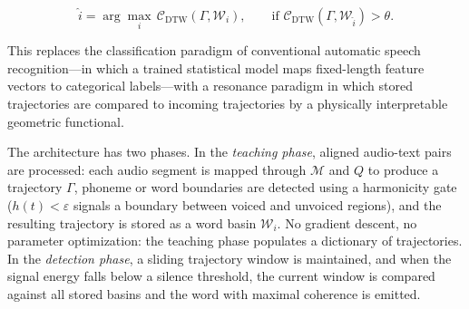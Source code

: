 \documentclass[12pt, a4paper]{article}
\begin{document}
\begin{equation}
\hat{i} = \arg\max_i\, \mathcal{C}_{\mathrm{DTW}}(\Gamma, \mathcal{W}_i), \qquad \text{if } \mathcal{C}_{\mathrm{DTW}}(\Gamma, \mathcal{W}_{\hat{i}}) > \theta.
\label{eq:recog}
\end{equation}

This replaces the classification paradigm of conventional automatic speech recognition---in which a trained statistical model maps fixed-length feature vectors to categorical labels---with a resonance paradigm in which stored trajectories are compared to incoming trajectories by a physically interpretable geometric functional.

The architecture has two phases. In the \emph{teaching phase}, aligned audio-text pairs are processed: each audio segment is mapped through $\mathcal{M}$ and $Q$ to produce a trajectory $\Gamma$, phoneme or word boundaries are detected using a harmonicity gate ($h(t) < \varepsilon$ signals a boundary between voiced and unvoiced regions), and the resulting trajectory is stored as a word basin $\mathcal{W}_i$. No gradient descent, no parameter optimization: the teaching phase populates a dictionary of trajectories. In the \emph{detection phase}, a sliding trajectory window is maintained, and when the signal energy falls below a silence threshold, the current window is compared against all stored basins and the word with maximal coherence is emitted.
\end{document}
